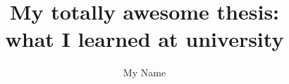 \documentclass[twoside,12pt]{mythesis} %
\title{My totally awesome thesis:\\%
  what I learned at university}
\author{My Name}
\begin{document}
\maketitle %

\allcontents %
\cleardoublepage
\mainbody

	
	

\formatbibliography %

\formatappendices

\end{document}
